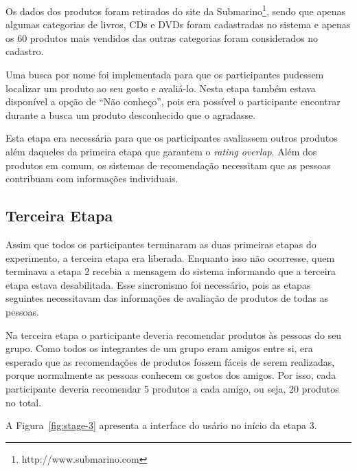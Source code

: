 Os dados dos produtos foram retirados do site da Submarino\footnote{http://www.submarino.com}, sendo que apenas algumas categorias de livros, CDs e DVDs foram cadastradas no sistema e apenas os 60 produtos mais vendidos das outras categorias foram considerados no cadastro.

Uma busca por nome foi implementada para que os participantes pudessem localizar um produto ao seu gosto e avaliá-lo. Nesta etapa também estava disponível a opção de ``Não conheço'', pois era possível o participante encontrar durante a busca um produto desconhecido que o agradasse.

Esta etapa era necessária para que os participantes avaliassem outros produtos além daqueles da primeira etapa que garantem o \textit{rating overlap}. Além dos produtos em comum, os sistemas de recomendação necessitam que as pessoas contribuam com informações individuais.


\subsection{Terceira Etapa}

Assim que todos os participantes terminaram as duas primeiras etapas do experimento, a terceira etapa era liberada. Enquanto isso não ocorresse, quem terminava a etapa 2 recebia a mensagem do sistema informando que a terceira etapa estava desabilitada. Esse sincronismo foi necessário, pois as etapas seguintes necessitavam das informações de avaliação de produtos de todas as pessoas.

Na terceira etapa o participante deveria recomendar produtos às pessoas do seu grupo. Como todos os integrantes de um grupo eram amigos entre si, era esperado que as recomendações de produtos fossem fáceis de serem realizadas, porque normalmente as pessoas conhecem os gostos dos amigos. Por isso, cada participante deveria recomendar 5 produtos a cada amigo, ou seja, 20 produtos no total.

A Figura~\ref{fig:stage-3} apresenta a interface do usário no início da etapa 3.

